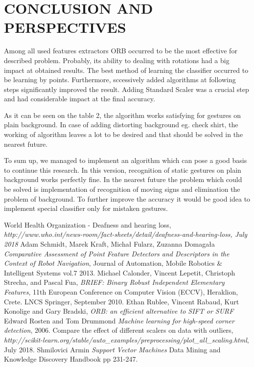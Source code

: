 \documentclass[11pt,a4paper]{article}
\begin{document}
\section{CONCLUSION AND PERSPECTIVES}

Among all used features extractors ORB occurred to be the most effective for described problem. Probably, its ability to dealing with rotations had a big impact at obtained results. The best method of learning the classifier occurred to be learning by points. Furthermore, sccessively added algorithms at following steps significantly improved the result. Adding Standard Scaler was a crucial step and had considerable impact at the final accuracy.

As it can be seen on the table 2, the algorithm works satisfying for gestures on plain background. In case of adding distorting background eg. check shirt, the working of algorithm leaves a lot to be desired and that should be solved in the nearest future.

To sum up, we managed to implement an algorithm which can pose a good basis to continue this research. In this version, recognition of static gestures on plain background works perfectly fine. In the nearest future the problem which could be solved is implementation of recognition of moving signs and elimination the problem of background. To further improve the accuracy it would be good idea to implement special classifier only for mistaken gestures.





\begin{thebibliography}{99}
 \setlength\baselineskip{5pt}
%

World Health Organization - Deafness and hearing loss,
\textit{http://www.who.int/news-room/fact-sheets/detail/deafness-and-hearing-loss, July 2018}
Adam Schmidt, Marek Kraft, Micha\l $ $ Fularz, Zuzanna Domaga\l a 
\textit{Comparative Assessment of Point Feature Detectors and Descriptors in the Context of Robot Navigation},
Journal of Automation, Mobile Robotics \& Intelligent Systems vol.7 2013.
Michael Calonder, Vincent Lepetit, Christoph Strecha, and Pascal Fua, 
\textit{BRIEF: Binary Robust Independent Elementary Features}, 11th European Conference on Computer Vision (ECCV), Heraklion, Crete. LNCS Springer, September 2010.
Ethan Rublee, Vincent Rabaud, Kurt Konolige and Gary Bradski, 
\textit{ORB: an efficient alternative to SIFT or SURF}
 Edward Rosten and Tom Drummond
\textit{Machine learning for high-speed corner detection},
 2006.
Compare the effect of different scalers on data with outliers,
\textit{http://scikit-learn.org/stable/auto\_examples/preprocessing/plot\_all\_scaling.html},
July 2018.
 Shmilovici Armin \textit{Support Vector Machines} Data Mining and Knowledge Discovery Handbook pp 231-247.


\end{thebibliography}
\end{document}
